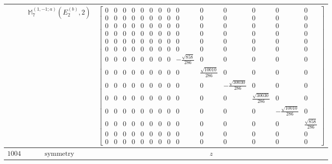 \documentclass[fleqn,8pt,landscape]{jsarticle}
\begin{document}
\begin{longtable}{ccc}
$  $ & $ \mathbb{M}_{7}^{(1,-1;a)}(E_{2}^{(b)},2) $ & $ \begin{bmatrix} 0 & 0 & 0 & 0 & 0 & 0 & 0 & 0 & 0 & 0 & 0 & 0 & 0 & 0 \\ 0 & 0 & 0 & 0 & 0 & 0 & 0 & 0 & 0 & 0 & 0 & 0 & 0 & 0 \\ 0 & 0 & 0 & 0 & 0 & 0 & 0 & 0 & 0 & 0 & 0 & 0 & 0 & 0 \\ 0 & 0 & 0 & 0 & 0 & 0 & 0 & 0 & 0 & 0 & 0 & 0 & 0 & 0 \\ 0 & 0 & 0 & 0 & 0 & 0 & 0 & 0 & 0 & 0 & 0 & 0 & 0 & 0 \\ 0 & 0 & 0 & 0 & 0 & 0 & 0 & 0 & 0 & 0 & 0 & 0 & 0 & 0 \\ 0 & 0 & 0 & 0 & 0 & 0 & 0 & 0 & - \frac{\sqrt{858}}{286} & 0 & 0 & 0 & 0 & 0 \\ 0 & 0 & 0 & 0 & 0 & 0 & 0 & 0 & 0 & \frac{\sqrt{10010}}{286} & 0 & 0 & 0 & 0 \\ 0 & 0 & 0 & 0 & 0 & 0 & 0 & 0 & 0 & 0 & - \frac{\sqrt{30030}}{286} & 0 & 0 & 0 \\ 0 & 0 & 0 & 0 & 0 & 0 & 0 & 0 & 0 & 0 & 0 & \frac{\sqrt{30030}}{286} & 0 & 0 \\ 0 & 0 & 0 & 0 & 0 & 0 & 0 & 0 & 0 & 0 & 0 & 0 & - \frac{\sqrt{10010}}{286} & 0 \\ 0 & 0 & 0 & 0 & 0 & 0 & 0 & 0 & 0 & 0 & 0 & 0 & 0 & \frac{\sqrt{858}}{286} \\ 0 & 0 & 0 & 0 & 0 & 0 & 0 & 0 & 0 & 0 & 0 & 0 & 0 & 0 \\ 0 & 0 & 0 & 0 & 0 & 0 & 0 & 0 & 0 & 0 & 0 & 0 & 0 & 0 \end{bmatrix} $ \\ \hline
$ 1004 $ & $ \text{symmetry} $ & $ z $ \\

\end{longtable}
\end{document}
